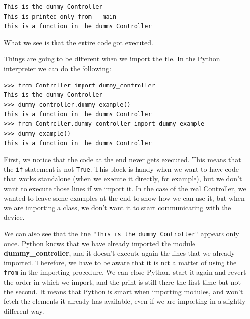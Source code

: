 \begin{verbatim}
This is the dummy Controller
This is printed only from __main__
This is a function in the dummy Controller
\end{verbatim}

What we see is that the entire code got executed.


Things are going to be different when we import the file. In the Python interpreter we can do the following:

\begin{verbatim}
>>> from Controller import dummy_controller
This is the dummy Controller
>>> dummy_controller.dummy_example()
This is a function in the dummy Controller
>>> from Controller.dummy_controller import dummy_example
>>> dummy_example()
This is a function in the dummy Controller
\end{verbatim}

First, we notice that the code at the end never gets executed. This means that the \texttt{if} statement is not \texttt{True}. This block is handy when we want to have code that works standalone (when we execute it directly, for example), but we don't want to execute those lines if we import it. In the case of the real Controller, we wanted to leave some examples at the end to show how we can use it, but when we are importing a class, we don't want it to start communicating with the device.

We can also see that the line \texttt{"This is the dummy Controller"} appears only once. Python knows that we have already imported the module \textbf{dummy\_controller}, and it doesn't execute again the lines that we already imported. Therefore, we have to be aware that it is not a matter of using the \texttt{from} in the importing procedure. We can close Python, start it again and revert the order in which we import, and the print is still there the first time but not the second. It means that Python is smart when importing modules, and won't fetch the elements it already has available, even if we are importing in a slightly different way.


